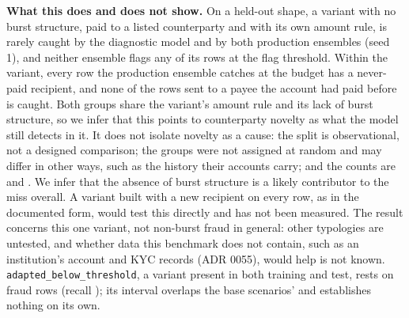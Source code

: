 \textbf{What this does and does not show.} On a held-out shape, a variant with no burst structure,
paid to a listed counterparty and with its own amount rule, is rarely caught by the diagnostic model
and by both production ensembles (seed 1), and neither ensemble flags any of its rows at the flag
threshold. Within the variant, every row the
production ensemble catches at the budget has a never-paid recipient, and none of the rows sent to a
payee the account had paid before is caught. Both groups share the variant's amount rule and its
lack of burst structure, so we infer that this points to counterparty novelty as what the model still
detects in it. It does not isolate novelty as a cause: the split is observational, not a designed comparison;
the groups were not assigned at random and may differ in other ways, such as the history their
accounts carry; and the counts are \nGateRevNewBudgetRows{} and \nGateRevKnownBudgetRows{}. We infer
that the absence of burst structure is a likely contributor to the miss overall. A variant built with
a new recipient on every row, as in the documented form, would test this directly and has not been
measured. The result concerns this one variant, not
non-burst fraud in general: other typologies are untested, and whether data this benchmark does not
contain, such as an institution's account and KYC records (ADR 0055), would help is not known.
\texttt{adapted\_below\_threshold}, a variant present in both training and test, rests on
\nAdaptFraud{} fraud rows (recall \nAdaptRecall{} \nAdaptCI{}); its interval overlaps the base
scenarios' and establishes nothing on its own.
